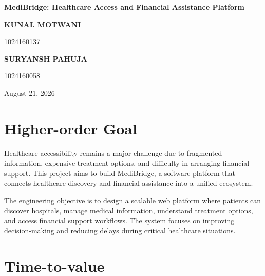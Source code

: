\documentclass[12pt,a4paper]{article}
\begin{document}

\begin{center}

\vspace*{0.15cm}

{\LARGE\bfseries MediBridge: Healthcare Access and Financial Assistance Platform}

\vspace{1.15cm}

{\large\bfseries KUNAL MOTWANI}

\vspace{0.08cm}

{\large 1024160137}

\vspace{0.35cm}

{\large\bfseries SURYANSH PAHUJA}

\vspace{0.08cm}

{\large 1024160058}

\vspace{0.65cm}

{\large August 21, 2026}

\end{center}

\vspace{0.7cm}


\section{Higher-order Goal}

Healthcare accessibility remains a major challenge due to fragmented
information, expensive treatment options, and difficulty in arranging
financial support. This project aims to build MediBridge, a software
platform that connects healthcare discovery and financial assistance into
a unified ecosystem.

The engineering objective is to design a scalable web platform where
patients can discover hospitals, manage medical information, understand
treatment options, and access financial support workflows. The system
focuses on improving decision-making and reducing delays during critical
healthcare situations.

\section{Time-to-value}
\end{document}
